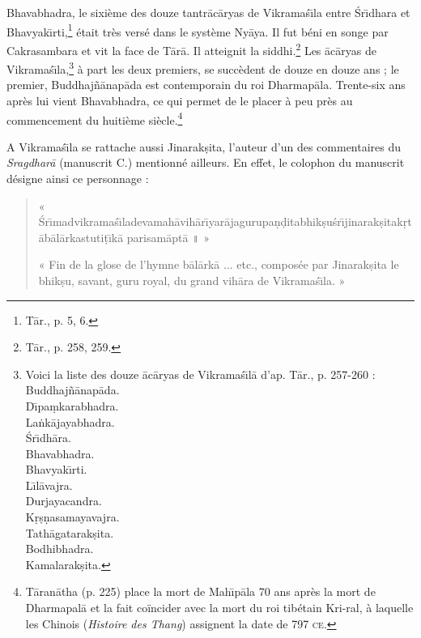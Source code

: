 \documentclass[a4paper, 11pt, oneside, french, landscape, twocolumn]{article}
\begin{document}
Bhavabhadra, le sixième des douze tantr\={a}c\={a}ryas de Vikrama\'{s}\={\i}la entre \'{S}r\={\i}dhara et Bhavyak\={\i}rti,\footnote{T\={a}r., p. 5, 6.} était très versé dans le système Ny\={a}ya. Il fut béni en songe par Cakrasambara et vit la face de T\={a}r\={a}. Il atteignit la siddhi.\footnote{T\={a}r., p. 258, 259.} Les \={a}c\={a}ryas de Vikrama\'{s}\={\i}la,\footnote{Voici la liste des douze \={a}c\={a}ryas de Vikrama\'{s}\={\i}l\={a} d'ap. T\={a}r., p. 257-260 :\\\hspace*{10mm}Buddhaj\~{n}\={a}nap\={a}da.\\\hspace*{10mm}D\={\i}pa\d{m}karabhadra.\\\hspace*{10mm}La\.{n}k\={a}jayabhadra.\\\hspace*{10mm}\'{S}r\={\i}dh\={a}ra.\\\hspace*{10mm}Bhavabhadra.\\\hspace*{10mm}Bhavyak\={\i}rti.\\\hspace*{10mm}L\={\i}l\={a}vajra.\\\hspace*{10mm}Durjayacandra.\\\hspace*{10mm}K\d{r}\d{s}\d{n}asamayavajra.\\\hspace*{10mm}Tath\={a}gatarak\d{s}ita.\\\hspace*{10mm}Bodhibhadra.\\\hspace*{10mm}Kamalarak\d{s}ita.} à part les deux premiers, se succèdent de douze en douze ans ; le premier, Buddhaj\~{n}\={a}nap\={a}da est contemporain du roi Dharmap\={a}la. Trente-six ans après lui vient Bhavabhadra, ce qui permet de le placer à peu près au commencement du huitième siècle.\footnote{T\={a}ran\={a}tha (p. 225) place la mort de Mah\={\i}p\={a}la 70 ans après la mort de Dharmapal\={a} et la fait coïncider avec la mort du roi tibétain Kri-ral, à laquelle les Chinois (\emph{Histoire des Thang}) assignent la date de 797 \textsc{ce}.}

A Vikrama\'{s}\={\i}la se rattache aussi Jinarak\d{s}ita, l'auteur d'un des commentaires du \emph{Sragdhar\={a}} (manuscrit C.) mentionné ailleurs. En effet, le colophon du manuscrit désigne ainsi ce personnage :
\begin{quotation}\footnotesize
« \'{S}r\={\i}madvikrama\'{s}\={\i}ladevamah\={a}vih\={a}r\={\i}yar\={a}jagurupa\d{n}\d{d}itabhik\d{s}u\'{s}r\={\i}jinarak\d{s}itak\d{r}t\={a}b\={a}l\={a}rkastuti\d{t}\={\i}k\={a} parisam\={a}pt\={a} \texthindi{॥} »

\bigskip

« Fin de la glose de l'hymne b\={a}l\={a}rk\={a} ... etc., composée par Jinarak\d{s}ita le bhik\d{s}u, savant, guru royal, du grand vih\={a}ra de Vikrama\'{s}\={\i}la. »
\end{quotation}
\end{document}
